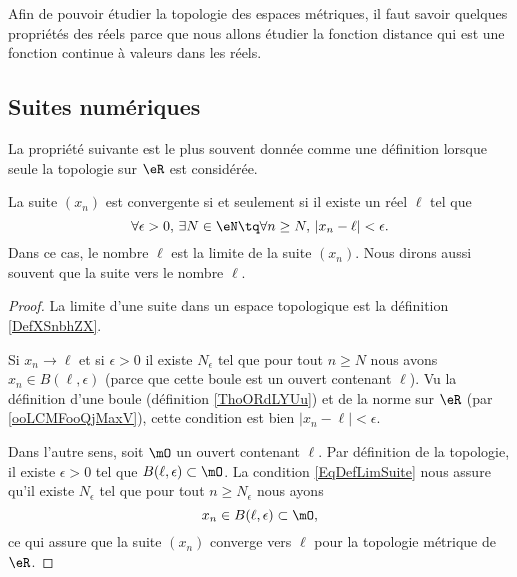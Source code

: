 Afin de pouvoir étudier la topologie des espaces métriques, il faut savoir quelques propriétés des réels parce que nous allons étudier la fonction distance qui est une fonction continue à valeurs dans les réels.

\subsection{Suites numériques}

La propriété suivante est le plus souvent donnée comme une définition lorsque seule la topologie sur \( \eR\) est considérée.
\begin{proposition}	\label{PropLimiteSuiteNum}
	La suite $(x_n)$ est convergente si et seulement si il existe un réel $\ell$ tel que
	\begin{equation}		\label{EqDefLimSuite}
		\forall \epsilon>0,\,\exists N\in\eN\tq\forall n\geq N,\,| x_n-\ell |<\epsilon.
	\end{equation}
	Dans ce cas, le nombre $\ell$ est la limite de la suite $(x_n)$. Nous dirons aussi souvent que la suite  vers le nombre $\ell$.
\end{proposition}

\begin{proof}
    La limite d'une suite dans un espace topologique est la définition \ref{DefXSnbhZX}. 

    Si \( x_n\to \ell\) et si \( \epsilon>0\) il existe \( N_{\epsilon}\) tel que pour tout \( n\geq N\) nous avons \( x_n\in B(\ell,\epsilon)\) (parce que cette boule est un ouvert contenant \( \ell\)). Vu la définition d'une boule (définition \ref{ThoORdLYUu}) et de la norme sur \( \eR\) (par \ref{ooLCMFooQjMaxV}), cette condition est bien \( | x_n-\ell |<\epsilon\).

    Dans l'autre sens, soit \( \mO\) un ouvert contenant \( \ell\). Par définition de la topologie, il existe \( \epsilon>0\) tel que \( B(\ell,\epsilon)\subset \mO\). La condition \eqref{EqDefLimSuite} nous assure qu'il existe \( N_{\epsilon} \) tel que pour tout \( n\geq N_{\epsilon}\) nous ayons
    \begin{equation}
        x_n\in B(\ell,\epsilon)\subset\mO,
    \end{equation}
    ce qui assure que la suite \( (x_n)\) converge vers \( \ell\) pour la topologie métrique de \( \eR\).
\end{proof}


